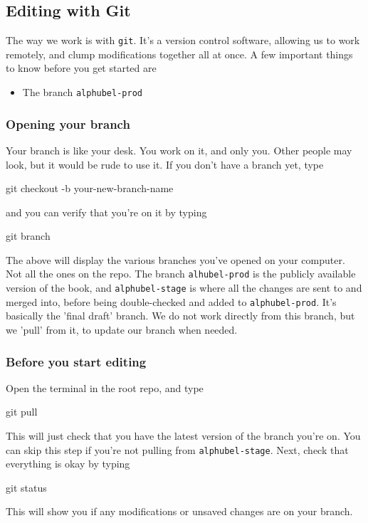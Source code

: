 \documentclass{article}
\begin{document}
\subsection{Editing with Git}

The way we work is with \texttt{git}. It's a version control software, allowing us to work remotely, and clump modifications together all at once. A few important things to know before you get started are
\begin{itemize}
\item The branch \texttt{alphubel-prod}
\end{itemize}
\subsubsection{Opening your branch}
Your branch is like your desk. You work on it, and only you. Other people may look, but it would be rude to use it. If you don't have a branch yet, type
\begin{bashcode}
     git checkout -b your-new-branch-name
\end{bashcode}
and you can verify that you're on it by typing
\begin{bashcode}
    git branch
\end{bashcode}
The above will display the various branches you've opened on your computer. Not all the ones on the repo. The branch \texttt{alhubel-prod} is the publicly available version of the book, and \texttt{alphubel-stage} is where all the changes are sent to and merged into, before being double-checked and added to \texttt{alphubel-prod}. It's basically the 'final draft' branch. We do not work directly from this branch, but we 'pull' from it, to update our branch when needed.
\subsubsection{Before you start editing}
Open the terminal in the root repo, and type 
\begin{bashcode}
    git pull 
\end{bashcode}
This will just check that you have the latest version of the branch you're on. You can skip this step if you're not pulling from \texttt{alphubel-stage}. Next, check that everything is okay by typing
\begin{bashcode}
    git status
\end{bashcode} 
This will show you if any modifications or unsaved changes are on your branch.
\end{document}
